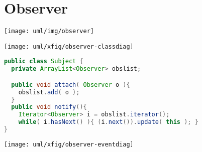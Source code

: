 \section{Observer}
\begin{center}
\texttt{[image: uml/img/observer]}

\texttt{[image: uml/xfig/observer-classdiag]}
\end{center}
\ifslides
\newpage
\fi
\begin{lstlisting}[language=java]
public class Subject {
  private ArrayList<Observer> obslist;

  public void attach( Observer o ){
    obslist.add( o );
  }
  public void notify(){
    Iterator<Observer> i = obslist.iterator();
    while( i.hasNext() ){ (i.next()).update( this ); }
}
\end{lstlisting}
\ifslides
\newpage
\fi
\begin{center}
\texttt{[image: uml/xfig/observer-eventdiag]}
\end{center}
\newpage
